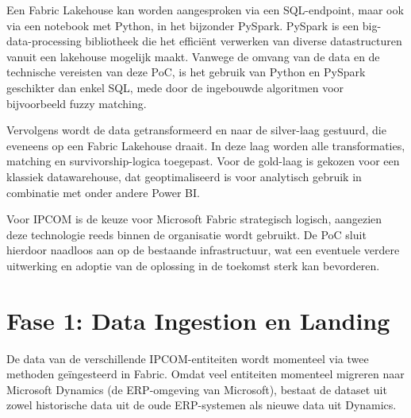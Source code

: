 Een Fabric Lakehouse kan worden aangesproken via een SQL-endpoint, maar ook via een notebook met Python, in het bijzonder PySpark. PySpark is een big-data-processing bibliotheek die het efficiënt verwerken van diverse datastructuren vanuit een lakehouse mogelijk maakt. Vanwege de omvang van de data en de technische vereisten van deze PoC, is het gebruik van Python en PySpark geschikter dan enkel SQL, mede door de ingebouwde algoritmen voor bijvoorbeeld fuzzy matching.

Vervolgens wordt de data getransformeerd en naar de silver-laag gestuurd, die eveneens op een Fabric Lakehouse draait. In deze laag worden alle transformaties, matching en survivorship-logica toegepast. Voor de gold-laag is gekozen voor een klassiek datawarehouse, dat geoptimaliseerd is voor analytisch gebruik in combinatie met onder andere Power BI.

Voor IPCOM is de keuze voor Microsoft Fabric strategisch logisch, aangezien deze technologie reeds binnen de organisatie wordt gebruikt. De PoC sluit hierdoor naadloos aan op de bestaande infrastructuur, wat een eventuele verdere uitwerking en adoptie van de oplossing in de toekomst sterk kan bevorderen.


\section{Fase 1: Data Ingestion en Landing}%
\label{sec:poc-landing}


De data van de verschillende IPCOM-entiteiten wordt momenteel via twee methoden geïngesteerd in Fabric. Omdat veel entiteiten momenteel migreren naar Microsoft Dynamics (de ERP-omgeving van Microsoft), bestaat de dataset uit zowel historische data uit de oude ERP-systemen als nieuwe data uit Dynamics.

